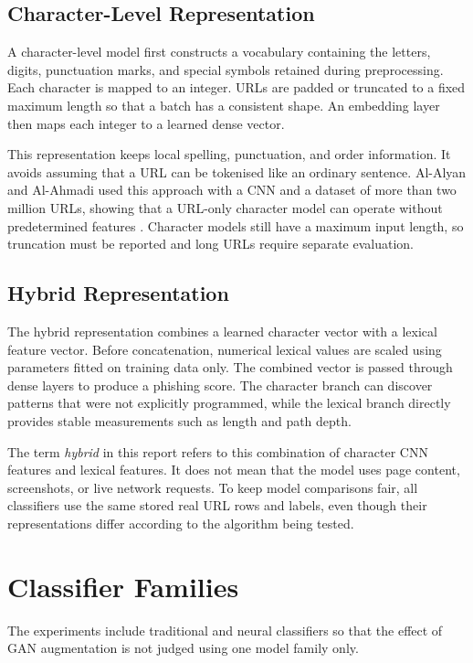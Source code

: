 \subsection{Character-Level Representation}

A character-level model first constructs a vocabulary containing the letters,
digits, punctuation marks, and special symbols retained during preprocessing.
Each character is mapped to an integer. URLs are padded or truncated to a fixed
maximum length so that a batch has a consistent shape. An embedding layer then
maps each integer to a learned dense vector.

This representation keeps local spelling, punctuation, and order information.
It avoids assuming that a URL can be tokenised like an ordinary sentence.
Al-Alyan and Al-Ahmadi used this approach with a CNN and a dataset of more than
two million URLs, showing that a URL-only character model can operate without
predetermined features \citep{alalyan2020robust}. Character models still have a
maximum input length, so truncation must be reported and long URLs require
separate evaluation.

\subsection{Hybrid Representation}

The hybrid representation combines a learned character vector with a lexical
feature vector. Before concatenation, numerical lexical values are scaled using
parameters fitted on training data only. The combined vector is passed through
dense layers to produce a phishing score. The character branch can discover
patterns that were not explicitly programmed, while the lexical branch directly
provides stable measurements such as length and path depth.

The term \emph{hybrid} in this report refers to this combination of character
CNN features and lexical features. It does not mean that the model uses page
content, screenshots, or live network requests. To keep model comparisons fair,
all classifiers use the same stored real URL rows and labels, even though their
representations differ according to the algorithm being tested.

\section{Classifier Families}

The experiments include traditional and neural classifiers so that the effect
of GAN augmentation is not judged using one model family only.

